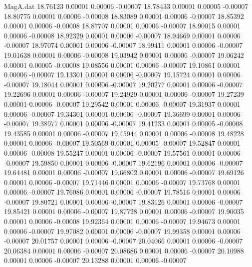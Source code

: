 \begin{filecontents}{MagA.dat}
  18.76123    0.00001    0.00006   -0.00007
  18.78433    0.00001    0.00005   -0.00007
  18.80775    0.00001    0.00006   -0.00008
  18.83089    0.00001    0.00006   -0.00007
  18.85392    0.00001    0.00006   -0.00008
  18.87707    0.00001    0.00006   -0.00007
  18.90015    0.00001    0.00006   -0.00008
  18.92329    0.00001    0.00006   -0.00007
  18.94669    0.00001    0.00006   -0.00007
  18.97074    0.00001    0.00006   -0.00007
  18.99411    0.00001    0.00006   -0.00007
  19.01638    0.00001    0.00006   -0.00008
  19.03942    0.00001    0.00006   -0.00007
  19.06242    0.00001    0.00005   -0.00008
  19.08556    0.00001    0.00006   -0.00007
  19.10861    0.00001    0.00006   -0.00007
  19.13301    0.00001    0.00006   -0.00007
  19.15724    0.00001    0.00006   -0.00007
  19.18044    0.00001    0.00006   -0.00007
  19.20277    0.00001    0.00006   -0.00007
  19.22696    0.00001    0.00006   -0.00007
  19.24929    0.00001    0.00006   -0.00007
  19.27239    0.00001    0.00006   -0.00007
  19.29542    0.00001    0.00006   -0.00007
  19.31937    0.00001    0.00006   -0.00007
  19.34301    0.00001    0.00006   -0.00007
  19.36699    0.00001    0.00006   -0.00007
  19.38977    0.00001    0.00006   -0.00007
  19.41233    0.00001    0.00005   -0.00008
  19.43585    0.00001    0.00006   -0.00007
  19.45944    0.00001    0.00006   -0.00008
  19.48228    0.00001    0.00006   -0.00007
  19.50569    0.00001    0.00005   -0.00007
  19.52847    0.00001    0.00006   -0.00008
  19.55247    0.00001    0.00006   -0.00007
  19.57561    0.00001    0.00006   -0.00007
  19.59850    0.00001    0.00006   -0.00007
  19.62196    0.00001    0.00006   -0.00007
  19.64481    0.00001    0.00006   -0.00007
  19.66802    0.00001    0.00006   -0.00007
  19.69126    0.00001    0.00006   -0.00007
  19.71446    0.00001    0.00006   -0.00007
  19.73768    0.00001    0.00006   -0.00007
  19.76086    0.00001    0.00006   -0.00007
  19.78516    0.00001    0.00006   -0.00007
  19.80721    0.00001    0.00006   -0.00007
  19.83126    0.00001    0.00006   -0.00007
  19.85421    0.00001    0.00006   -0.00007
  19.87728    0.00001    0.00006   -0.00007
  19.90035    0.00001    0.00006   -0.00008
  19.92364    0.00001    0.00006   -0.00007
  19.94673    0.00001    0.00006   -0.00007
  19.97082    0.00001    0.00006   -0.00007
  19.99358    0.00001    0.00006   -0.00007
  20.01757    0.00001    0.00006   -0.00007
  20.04066    0.00001    0.00006   -0.00007
  20.06384    0.00001    0.00006   -0.00007
  20.08686    0.00001    0.00006   -0.00007
  20.10988    0.00001    0.00006   -0.00007
  20.13288    0.00001    0.00006   -0.00007

\end{filecontents}
